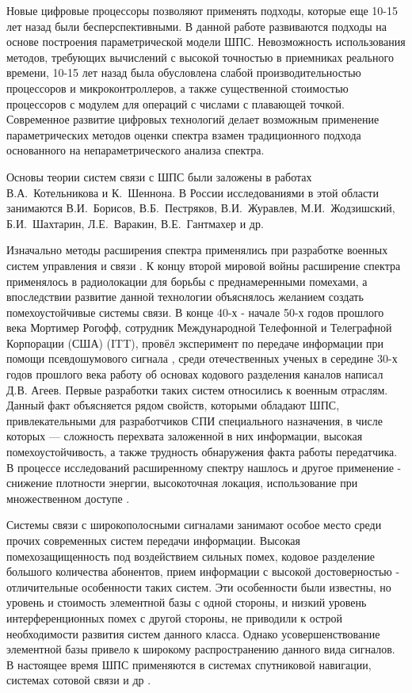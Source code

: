 Новые цифровые процессоры позволяют применять подходы, которые еще 10-15 лет назад были бесперспективными.
В данной работе развиваются подходы на основе построения параметрической модели ШПС. Невозможность использования
методов, требующих вычислений с высокой точностью в приемниках реального времени,
10-15 лет назад была обусловлена слабой производительностью процессоров и микроконтроллеров, а также существенной
стоимостью процессоров с модулем для операций с числами с плавающей точкой. Современное развитие цифровых технологий делает 
возможным применение параметрических методов оценки спектра взамен традиционного подхода основанного на непараметрического
анализа спектра.

Основы теории систем связи с ШПС были заложены в работах \mbox{В.А. Котельникова} и \mbox{К. Шеннона}.
В России исследованиями в этой области занимаются \mbox{В.И. Борисов}, \mbox{В.Б. Пестряков}, \mbox{В.И. Журавлев}, \mbox{М.И. Жодзишский},
\mbox{Б.И. Шахтарин}, \mbox{Л.Е.  Варакин}, \mbox{В.Е. Гантмахер} и др.

Изначально методы расширения спектра применялись при разработке военных систем управления и связи \cite{sklyar}.
К концу второй мировой войны расширение спектра применялось в радиолокации для борьбы с преднамеренными помехами, а
впоследствии развитие данной технологии объяснялось желанием создать помехоустойчивые системы связи.
В конце 40-х - начале 50-х годов прошлого века Мортимер Рогофф, сотрудник Международной Телефонной и Телеграфной Корпорации (США) (ITT),
провёл эксперимент по передаче информации при помощи псевдошумового сигнала \cite{sklyar}, среди отечественных ученых
в середине 30-х годов прошлого века работу об основах кодового разделения каналов написал Д.В. Агеев.
Первые разработки таких систем относились к военным отраслям. Данный факт объясняется рядом свойств, которыми обладают
ШПС, привлекательными для разработчиков СПИ специального назначения, в числе которых — сложность перехвата заложенной в них информации,
высокая помехоустойчивость, а также трудность обнаружения факта работы передатчика. В процессе исследований расширенному спектру
нашлось и другое применение - снижение плотности энергии, высокоточная локация, использование при множественном доступе
\cite{sklyar}.

Системы связи с широкополосными сигналами занимают особое место среди прочих современных систем передачи информации.
Высокая помехозащищенность под воздействием сильных помех, кодовое разделение большого количества абонентов, прием
информации с высокой достоверностью - отличительные особенности таких систем. Эти особенности были известны, но
уровень и стоимость элементной базы с одной стороны, и низкий уровень интерференционных помех с другой стороны, не приводили к острой необходимости развития систем данного класса.
Однако усовершенствование элементной базы привело к широкому распространению данного вида сигналов. В настоящее время ШПС применяются в системах спутниковой навигации,
системах сотовой связи и др \cite{varakin-book}.

